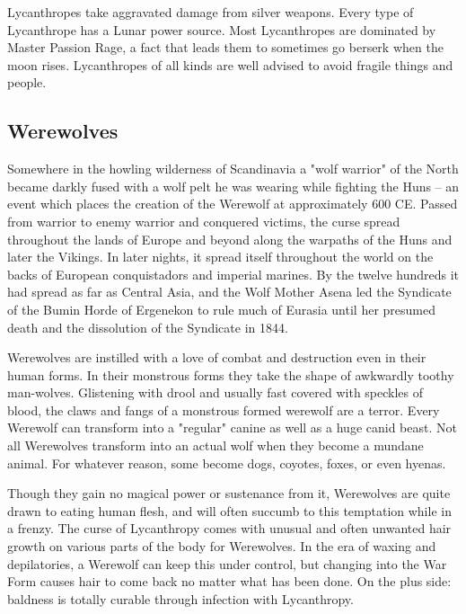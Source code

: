 Lycanthropes take aggravated damage from silver weapons. Every type of Lycanthrope has a Lunar power source. Most Lycanthropes are dominated by Master Passion Rage, a fact that leads them to sometimes go berserk when the moon rises. Lycanthropes of all kinds are well advised to avoid fragile things and people.

\subsection{Werewolves} 

Somewhere in the howling wilderness of Scandinavia a "wolf warrior" of the North became darkly fused with a wolf pelt he was wearing while fighting the Huns -- an event which places the creation of the Werewolf at approximately 600 CE. Passed from warrior to enemy warrior and conquered victims, the curse spread throughout the lands of Europe and beyond along the warpaths of the Huns and later the Vikings. In later nights, it spread itself throughout the world on the backs of European conquistadors and imperial marines. By the twelve hundreds it had spread as far as Central Asia, and the Wolf Mother Asena led the Syndicate of the Bumin Horde of Ergenekon to rule much of Eurasia until her presumed death and the dissolution of the Syndicate in 1844.

Werewolves are instilled with a love of combat and destruction even in their human forms. In their monstrous forms they take the shape of awkwardly toothy man-wolves. Glistening with drool and usually fast covered with speckles of blood, the claws and fangs of a monstrous formed werewolf are a terror. Every Werewolf can transform into a "regular" canine as well as a huge canid beast. Not all Werewolves transform into an actual wolf when they become a mundane animal. For whatever reason, some become dogs, coyotes, foxes, or even hyenas.

Though they gain no magical power or sustenance from it, Werewolves are quite drawn to eating human flesh, and will often succumb to this temptation while in a frenzy. The curse of Lycanthropy comes with unusual and often unwanted hair growth on various parts of the body for Werewolves. In the era of waxing and depilatories, a Werewolf can keep this under control, but changing into the War Form causes hair to come back no matter what has been done. On the plus side: baldness is totally curable through infection with Lycanthropy.

